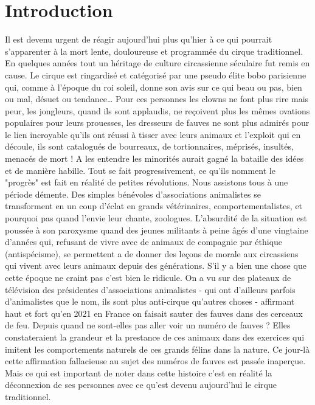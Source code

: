 \chapter*{Introduction}

Il est devenu urgent de réagir aujourd’hui plus qu’hier à ce qui pourrait s’apparenter à la mort lente, douloureuse et programmée du cirque traditionnel. En quelques années tout un héritage de culture circassienne séculaire fut remis en cause. Le cirque est ringardisé et catégorisé par une pseudo élite bobo parisienne qui, comme à l’époque du roi soleil, donne son avis sur ce qui beau ou pas, bien ou mal, désuet ou tendance… Pour ces personnes les clowns ne font plus rire mais peur, les jongleurs, quand ils sont applaudis, ne reçoivent plus les mêmes ovations populaires pour leurs prouesses, les dresseurs de fauves ne sont plus admirés pour le lien incroyable qu’ils ont réussi à tisser avec leurs animaux et l’exploit qui en découle, ils sont catalogués de bourreaux, de tortionnaires, méprisés, insultés, menacés de mort ! A les entendre les minorités aurait gagné la bataille des idées et de manière habille. Tout se fait progressivement, ce qu’ils nomment le "progrès" est fait en réalité de petites révolutions. Nous assistons tous à une période démente. Des simples bénévoles d’associations animalistes se transforment en un coup d’éclat en grands vétérinaires, comportementalistes, et pourquoi pas quand l’envie leur chante, zoologues. L’absurdité de la situation est poussée à son paroxysme quand des jeunes militants à peine âgés d’une vingtaine d’années qui, refusant de vivre avec de animaux de compagnie par éthique (antispécisme), se permettent a de donner des leçons de morale aux circassiens qui vivent avec leurs animaux depuis des générations. S’il y a bien une chose que cette époque ne craint pas c’est bien le ridicule. On a vu sur des plateaux de télévision des présidentes d’associations animalistes - qui ont d’ailleurs parfois d’animalistes que le nom, ils sont plus anti-cirque qu’autres choses - affirmant haut et fort qu’en 2021 en France on faisait sauter des fauves dans des cerceaux de feu. Depuis quand ne sont-elles pas aller voir un numéro de fauves ? Elles constateraient la grandeur et la prestance de ces animaux dans des exercices qui imitent les comportements naturels de ces grands félins dans la nature. Ce jour-là cette affirmation fallacieuse au sujet des numéros de fauves est passée inaperçue. Mais ce qui est important de noter dans cette histoire c’est en réalité la déconnexion de ses personnes avec ce qu’est devenu aujourd’hui le cirque traditionnel.
